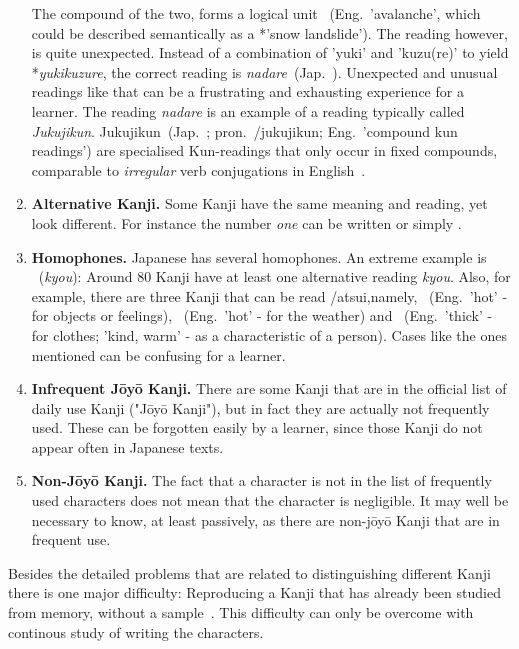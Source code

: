 \begin{enumerate}
        The compound of the two, forms a logical unit 
        ~(Eng.\ 'avalanche', which could be described semantically as a
        *'snow landslide'). The reading however, is quite unexpected. Instead of
        a combination of 'yuki' and 'kuzu(re)' to yield *\emph{yukikuzure},
        the correct reading is \emph{nadare}~(Jap.\ ).
        Unexpected and unusual readings like that can be a frustrating and 
        exhausting experience for a learner. %
        The reading \emph{nadare} is an example of a reading typically called
        \emph{Jukujikun}.
        Jukujikun~(Jap.\ ; pron.\ /jukujikun; 
        Eng.\ 'compound kun readings') are specialised Kun-readings that only 
        occur in fixed compounds, comparable to \emph{irregular} verb 
        conjugations in English~.
     
  \item \textbf{Alternative Kanji.} Some Kanji have the same meaning and reading,
        yet look different. For instance the number \emph{one} can be written
         or simply .

  \item \textbf{Homophones.} Japanese has several homophones. An extreme example
        is ~(\emph{kyou}): Around 80 Kanji have at least one 
        alternative reading \emph{kyou}. 
        Also, for example, there are three Kanji 
        that can be read /atsui,namely, 
        ~(Eng.\ 'hot' - for objects or feelings), 
        ~(Eng.\ 'hot' - for the weather) and 
        ~(Eng.\ 'thick' - for clothes; 'kind, warm' - as a 
        characteristic of a person). Cases like the ones mentioned can be 
        confusing for a learner.

  \item \textbf{Infrequent Jōyō Kanji.} There are some Kanji that are in the 
        official list of daily use Kanji ("Jōyō Kanji"), 
        but in fact they are actually not frequently used. These can be 
        forgotten easily by a learner, since those Kanji do 
        not appear often in Japanese texts.

  \item \textbf{Non-Jōyō Kanji.} The fact that a character is not in the list 
        of frequently used characters does not mean that the character is 
        negligible. It may well be necessary to know, at least passively,
        as there are non-jōyō Kanji that are in frequent use.
\end{enumerate}
Besides the detailed problems that are related to distinguishing different Kanji 
there is one major difficulty:
Reproducing a Kanji that has already been studied from memory, without a
sample~. This difficulty can only be overcome with 
continous study of writing the characters.

